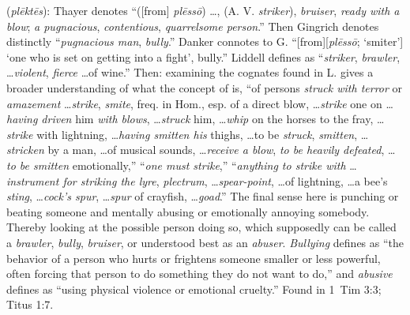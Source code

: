 \item[Abuser,]

(\textit{plēktēs}):
Thayer denotes ``([from] \emph{plēssō}) \ldots, (A. V. \emph{striker}), \emph{bruiser}, \emph{ready with a blow}; \emph{a pugnacious}, \emph{contentious}, \emph{quarrelsome person}.'' 
Then Gingrich denotes distinctly ``\emph{pugnacious man}, \emph{bully}.'' 
Danker connotes to G. ``[from][\emph{plēssō}; `smiter'] `one who is set on getting into a fight', bully.'' 
Liddell defines  as ``\emph{striker}, \emph{brawler}, \ldots \emph{violent}, \emph{fierce} \ldots of wine.'' 
Then: examining the cognates found in L. gives a broader understanding of what the concept of  is,
 ``of persons \emph{struck with terror} or \emph{amazement} \ldots \emph{strike}, \emph{smite}, freq. in Hom., esp. of a direct blow, \ldots \emph{strike} one on \ldots \emph{having driven} him \emph{with blows}, \ldots \emph{struck} him, \ldots \emph{whip} on the horses to the fray, \ldots \emph{strike} with lightning, \ldots \emph{having smitten his} thighs, \ldots to be \emph{struck}, \emph{smitten}, \ldots \emph{stricken} by a man, \ldots of musical sounds, \ldots \emph{receive a blow}, \emph{to be heavily defeated}, \ldots \emph{to be smitten} emotionally,''
 ``\emph{one must strike},'' 
 ``\emph{anything to strike with} \ldots \emph{instrument for striking the lyre}, \emph{plectrum}, \ldots \emph{spear-point}, \ldots of lightning, \ldots a bee's \emph{sting}, \ldots \emph{cock's spur}, \ldots \emph{spur} of crayfish, \ldots \emph{goad}.''
The final sense here is punching or beating someone and mentally abusing or emotionally annoying somebody. Thereby looking at the possible person doing so, which supposedly can be called a \emph{brawler}, \emph{bully}, \emph{bruiser}, or understood best as an \emph{abuser}. \emph{Bullying} defines as ``the behavior of a person who hurts or frightens someone smaller or less powerful, often forcing that person to do something they do not want to do,'' and \emph{abusive} defines as ``using physical violence or emotional cruelty.''
Found in 1~Tim 3:3; Titus 1:7.
